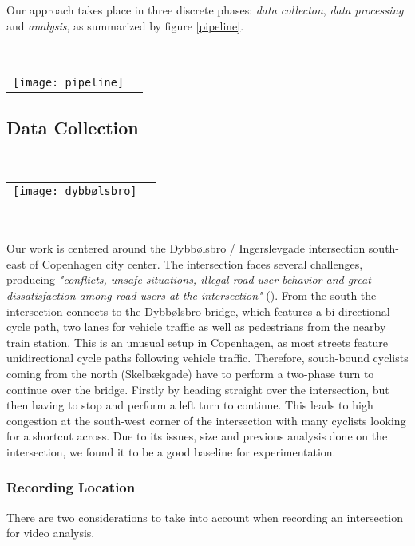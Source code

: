 Our approach takes place in three discrete phases: \textit{data collecton}, \textit{data processing} and \textit{analysis}, as summarized
by figure \ref{pipeline}.

\ \\ 
\raggedbottom
\begin{tabular}{@{}cc}
\texttt{[image: pipeline]} 
\end{tabular}
\label{pipeline}

\subsection{Data Collection}
\ \\ 
\noindent
\begin{tabular}{@{}cc}
\texttt{[image: dybbølsbro]}
\end{tabular}
\label{intersection_overview}
\

Our work is centered around the Dybbølsbro / Ingerslevgade intersection south-east of Copenhagen
city center. The intersection faces several challenges, producing \textit{"conflicts, unsafe situations, illegal 
road user behavior and great dissatisfaction among road users at the intersection"} (\cite{CPHpost_2021}).
From the south the intersection connects to the Dybbølsbro bridge, which features a bi-directional cycle path, two
lanes for vehicle traffic as well as pedestrians from the nearby train station. 
This is an unusual setup in Copenhagen, as most streets feature unidirectional cycle paths 
following vehicle traffic. Therefore, south-bound cyclists coming from the north (Skelbækgade) have to perform a two-phase 
turn to continue over the bridge. Firstly by heading straight over the intersection, but then having to stop and perform a left turn to 
continue. This leads to high congestion at the south-west corner of the intersection with many cyclists looking for a shortcut across. 
Due to its issues, size and previous analysis done on the intersection, we found it to be a good baseline for experimentation.

\subsubsection{Recording Location}
There are two considerations to take into account when recording an intersection for video analysis.
\ \\

